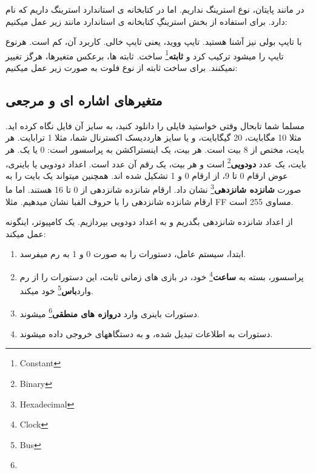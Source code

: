 \documentclass[14pt,a4paper]{memoir}
\begin{document}
	 در  مانند پایتان، نوع استرینگ نداریم. اما در کتابخانه ی استاندارد استرینگ داریم که  نام دارد. برای استفاده از بخش استرینگِ کتابخانه ی استاندارد مانند زیر عمل میکنیم:
	 
	 
	 
	 	 		 	 	 	 \begin{latin}
	 	
	 \end{latin}
	 
	 
	 
	 
	 با تایپ بولی نیز آشنا هستید. تایپ ووید، یعنی تایپ خالی. کاربرد آن، کم است.
	 هرنوع تایپ را میشود ترکیب کرد و \textbf{ثابته}\footnote{Constant} ساخت. ثابته ها، برعکس متغیرها، هرگز تغییر نمیکنند. برای ساخت ثابته از نوع فلوت به صورت زیر عمل میکنیم:
	 
	 \begin{latin}
	 	
	 \end{latin}
	 
	 
	 \subsection{متغیرهای اشاره ای و مرجعی}\label{refpointer}
	 
	 مسلما شما تابحال وقتی خواستید فایلی را دانلود کنید، به سایز آن فایل نگاه کرده اید. مثلا 10 مگابایت، 20 گیگابایت، و یا سایز هارددیسک اکسترنال شما، مثلا 1 ترابایت. هر بایت، مختص از 8 بیت است. هر بیت، یک اینستراکشن به پراسسور است: 0 یا یک. هر بایت، یک عدد \textbf{دودویی}\footnote{Binary} است و هر بیت، یک رقم آن عدد است. اعداد دودویی یا باینری، عوض ارقام 0 تا 9، از ارقام 0 و 1 تشکیل شده اند. همچنین میتواند یک بایت را به صورت \textbf{شانزده شانزدهی}\footnote{Hexadecimal} نشان داد. ارقام شانزده شانزدهی از 0 تا 16 هستند. اما ما ارقام شانزده شانزدهی را با حروف الفبا نشان میدهیم. مثلا FF مساوی 255 است.
	 	
	 از اعداد شانزده شانزدهی بگدریم و به اعداد دودویی بپردازیم. یک کامپیوتر، اینگونه عمل میکند:
	 
	 \begin{enumerate}
	 	\item ابتدا، سیستم عامل، دستورات را به صورت 0 و 1 به رم میفرسد.
	 	\item پراسسور، بسته به \textbf{ساعت}\footnote{Clock} خود، در بازی های زمانی ثابت، این دستورات را از رم وارد\textbf{باس}\footnote{Bus} خود میکند.
	 	\item دستورات باینری وارد \textbf{دروازه های منطقی}\footnote{} میشوند.
	 	\item دستورات به اطلاعات تبدیل شده، و به دستگاههای خروجی داده میشوند.
 	 \end{enumerate}
  
\end{document}
